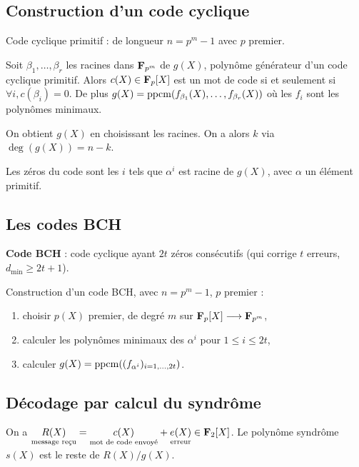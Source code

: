 \subsection{Construction d'un code cyclique}

	Code cyclique primitif : de longueur $n = p^m - 1$ avec $p$ premier.

	\begin{thm}
		Soit $\beta_1,\ldots,\beta_r$ les racines dans $\mathbf{F}_{p^m}$ de $g(X)$, polynôme générateur d'un code cyclique primitif.
		Alors $c(X) \in \mathbf{F}_p[X]$ est un mot de code si et seulement si $\forall i, c(\beta_i) = 0$.
		De plus $g(X) = \operatorname{ppcm}(f_{\beta_1}(X),\ldots,f_{\beta_r}(X))$ où les $f_i$ sont les polynômes minimaux.
	\end{thm}

	On obtient $g(X)$ en choisissant les racines.
	On a alors $k$ via $\deg(g(X)) = n - k$.

	Les zéros du code sont les $i$ tels que $\alpha^i$ est racine de $g(X)$, avec $\alpha$ un élément primitif.


\subsection{Les codes BCH}

	\begin{defn}
		\textbf{Code BCH} : code cyclique ayant $2t$ zéros consécutifs (qui corrige $t$ erreurs, $d_{\min} \geq 2t + 1$).
	\end{defn}

	Construction d'un code BCH, avec $n = p^m - 1$, $p$ premier :
	\begin{enumerate}[1)]
		\item choisir $p(X)$ premier, de degré $m$ sur $\mathbf{F}_p[X] \longrightarrow \mathbf{F}_{p^m}$,
		\item calculer les polynômes minimaux des $\alpha^i$ pour $1 \leq i \leq 2t$,
		\item calculer $g(X) = \operatorname{ppcm}((f_{\alpha^i})_{i = 1,\ldots,2t})$.
	\end{enumerate}


\subsection{Décodage par calcul du syndrôme}

	On a $\underset{\text{message reçu}}{R(X)} = \underset{\text{mot de code envoyé}}{c(X)} + \underset{\text{erreur}}{e(X)} \in \mathbf{F}_2[X]$.
	Le polynôme syndrôme $s(X)$ est le reste de $R(X)/g(X)$.

